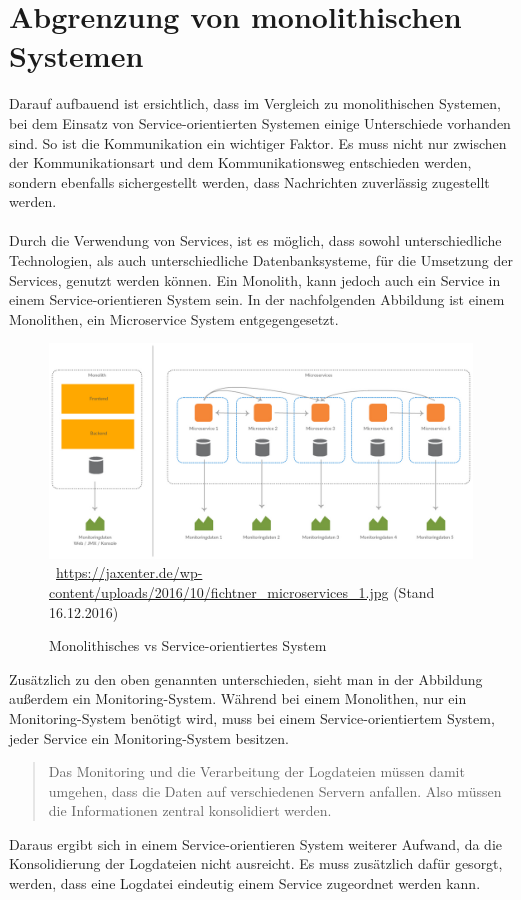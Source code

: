 \section{Abgrenzung von monolithischen Systemen}
\label{sec:AbgrenzungVonMonolithischenSystemen}
Darauf aufbauend ist ersichtlich, dass im Vergleich zu monolithischen Systemen, bei dem Einsatz von Service-orientierten Systemen einige Unterschiede vorhanden sind. So ist die Kommunikation ein wichtiger Faktor. Es muss nicht nur zwischen der Kommunikationsart und dem Kommunikationsweg entschieden werden, sondern ebenfalls sichergestellt werden, dass Nachrichten zuverlässig zugestellt werden.
\\\\
Durch die Verwendung von Services, ist es möglich, dass sowohl unterschiedliche Technologien, als auch unterschiedliche Datenbanksysteme, für die Umsetzung der Services, genutzt werden können. Ein Monolith, kann jedoch auch ein Service in einem Service-orientieren System sein. In der nachfolgenden Abbildung ist einem Monolithen, ein Microservice System entgegengesetzt.
\begin{figure}[htb]
    \centering 
    \includegraphics[width=\linewidth]{content/images/fichtner_microservices_1}\
    \quelle\url{https://jaxenter.de/wp-content/uploads/2016/10/fichtner_microservices_1.jpg} (Stand 16.12.2016)
    \caption{Monolithisches vs Service-orientiertes System}
    \label{fig:BoundedContext}  
\end{figure}
Zusätzlich zu den oben genannten unterschieden, sieht man in der Abbildung außerdem ein Monitoring-System. Während bei einem Monolithen, nur ein Monitoring-System benötigt wird, muss bei einem Service-orientiertem System, jeder Service ein Monitoring-System besitzen. 

\begin{quotation}
	\frqq Das Monitoring und die Verarbeitung der Logdateien müssen damit umgehen, dass die Daten auf verschiedenen Servern anfallen. Also müssen die Informationen zentral konsolidiert werden.\flqq\ \cite[S. 18]{EWolff2016:Microservices}
\end{quotation}

Daraus ergibt sich in einem Service-orientieren System weiterer Aufwand, da die Konsolidierung der Logdateien nicht ausreicht. Es muss zusätzlich dafür gesorgt, werden, dass eine Logdatei eindeutig einem Service zugeordnet werden kann.